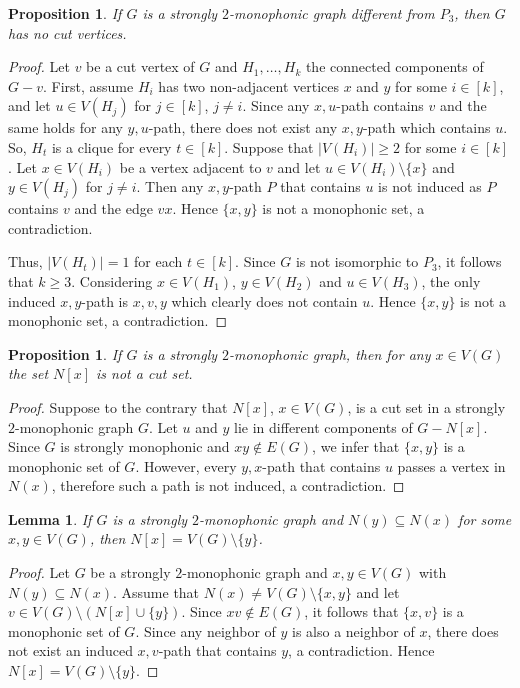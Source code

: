 \documentclass[a4paper,11pt]{article}
\newtheorem{lemma}[theorem]{Lemma}
\newtheorem{proposition}[theorem]{Proposition}
\begin{document}
\iffalse 
\begin{proposition}\label{prp:cutVertex}
    If $G$ is a strongly $2$-monophonic graph different from $P_3$, then $G$ has no cut vertices.
\end{proposition}
\begin{proof}
    Let $v$ be a cut vertex of $G$ and $H_1,\ldots,H_k$ the connected components of $G-v$. First, assume $H_i$ has two non-adjacent vertices $x$ and $y$ for some $i\in [k]$, and let $u \in V(H_j)$ for $j\in [k]$, $j\neq i$. Since any $x,u$-path contains $v$ and the same holds for any $y,u$-path, there does not exist any $x,y$-path which contains $u$. So, $H_t$ is a clique for every $t\in [k]$. Suppose that $|V(H_i)| \geq 2$ for some $i \in [k]$. Let $x \in V(H_i)$ be a vertex adjacent to $v$  and let $u \in V(H_i) \setminus \{x\}$ and $y \in V(H_j)$ for $j \neq i$. Then any $x,y$-path $P$ that contains $u$ is not induced as $P$ contains $v$ and the edge $vx$. Hence $\{x,y\}$ is not a monophonic set, a contradiction.
    
    Thus, $|V(H_t)|=1$ for each $t\in [k]$.
    Since $G$ is not isomorphic to $P_3$, it follows that $k\geq 3$. Considering $x\in V(H_1)$, $y\in V(H_2)$ and $u\in V(H_3)$, the only induced $x,y$-path is $x,v,y$ which clearly does not contain $u$. Hence $\{x,y\}$ is not a monophonic set, a contradiction. 
\end{proof}


\begin{proposition}
\label{prp:cutset}
    If $G$ is a strongly $2$-monophonic graph, then for any $x\in V(G)$ the set $N[x]$ is not a cut set.
\end{proposition}
\begin{proof}
Suppose to the contrary that $N[x]$, $x\in V(G)$, is a cut set in a strongly $2$-monophonic graph $G$. Let $u$ and $y$ lie in different components of $G-N[x]$. Since $G$ is strongly monophonic and $xy\notin E(G)$, we infer that $\{x,y\}$ is a monophonic set of $G$. However, every $y,x$-path that contains $u$ passes a vertex in $N(x)$, therefore such a path is not induced, a contradiction.  
\end{proof}


\begin{lemma}\label{l:neigho}
    If $G$ is a strongly $2$-monophonic graph and $N(y)\subseteq N(x)$ for some $x,y\in V(G)$, then $N[x]=V(G)\setminus\{y\}$.
\end{lemma}
\begin{proof}
    Let $G$ be a strongly $2$-monophonic graph and $x,y\in V(G)$ with $N(y)\subseteq N(x)$. Assume that $N(x)\neq V(G)\setminus\{x,y\}$ and let $v\in V(G) \setminus (N[x]\cup\{y\})$. Since $xv\notin E(G)$, it follows that $\{x,v\}$ is a monophonic set of $G$. Since any neighbor of $y$ is also a neighbor of $x$, there does not exist an induced $x,v$-path that contains $y$, a contradiction. Hence $N[x]=V(G)\setminus \{y\}$.
\end{proof}
\end{document}

